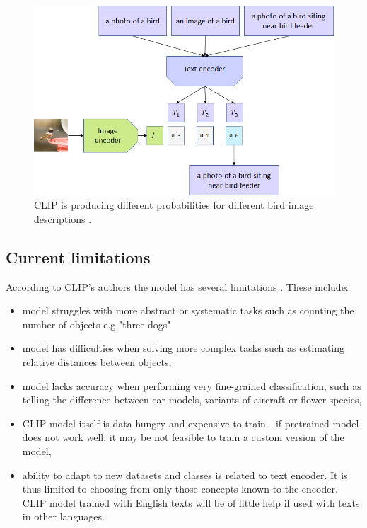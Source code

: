 \documentclass[11pt,a4paper,openany]{book}
\begin{document}
 \begin{figure}[ht!]
     \centering
     \includegraphics[scale=0.5]{figs/clip_model_3.png}
     \caption{CLIP is producing different probabilities for different bird image descriptions \cite{clip_source}.}
 \end{figure}
 \newpage
 \subsection*{Current limitations}
\noindent According to CLIP's authors the model has several limitations \cite{clip_blog}. These include:
\begin{itemize}
\item model struggles with more abstract or systematic tasks such as counting the number of objects e.g "three dogs"
\item model has difficulties when solving more complex tasks such as estimating relative distances between objects,
\item  model lacks accuracy when performing very fine-grained classification, such as telling the difference between car models, variants of aircraft or flower species,
\item CLIP model itself is data hungry and expensive to train - if pretrained model does not work well, it may be not feasible to train a custom version of the model,
\item ability to adapt to new datasets and classes is related to text encoder. It is thus limited to choosing from only those concepts known to the encoder. CLIP model trained with English texts will be of little help if used with texts in other languages. \\
\end{itemize}
\end{document}
